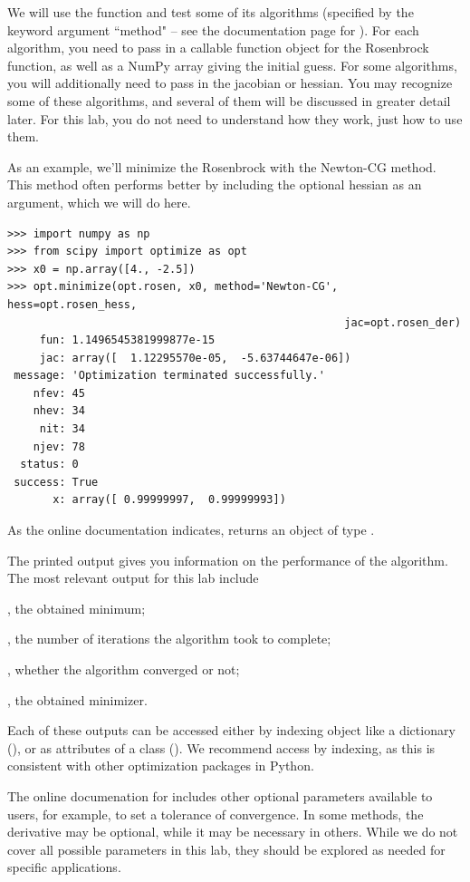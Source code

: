 We will use the  function and test some of its algorithms (specified by the keyword argument ``method" -- see the documentation page for ).
For each algorithm, you need to pass in a callable function object for the Rosenbrock function, as well as a NumPy array giving the initial guess.
For some algorithms, you will additionally need to pass in the jacobian or hessian.
You may recognize some of these algorithms, and several of them will be discussed in greater detail later. For this lab, you do not need to understand how they work, just
how to use them.

As an example, we'll minimize the Rosenbrock with the Newton-CG method. 
This method often performs better by including the optional hessian as an argument, which we will do here.
\begin{lstlisting}
>>> import numpy as np
>>> from scipy import optimize as opt
>>> x0 = np.array([4., -2.5])
>>> opt.minimize(opt.rosen, x0, method='Newton-CG', hess=opt.rosen_hess, 
													jac=opt.rosen_der)
     fun: 1.1496545381999877e-15
     jac: array([  1.12295570e-05,  -5.63744647e-06])
 message: 'Optimization terminated successfully.'
    nfev: 45
    nhev: 34
     nit: 34
    njev: 78
  status: 0
 success: True
       x: array([ 0.99999997,  0.99999993])
\end{lstlisting}
As the online documentation indicates,  returns an object of type . 

The printed output gives you information on the performance of the algorithm. 
The most relevant output for this lab include 

, the obtained minimum; 

, the number of iterations the algorithm took to complete; 

, whether the algorithm converged or not; 

, the obtained minimizer.

Each of these outputs can be accessed either by indexing  object like a dictionary (), or as attributes of a class ().  
We recommend access by indexing, as this is consistent with other optimization packages in Python.

The online documenation for  includes other optional parameters available to users, for example, to set a tolerance of convergence. 
In some methods, the derivative may be optional, while it may be necessary in others. 
While we do not cover all possible parameters in this lab, they should be explored as needed for specific applications.

